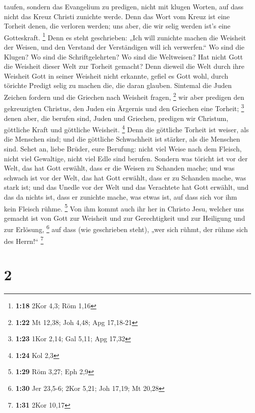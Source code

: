 taufen, sondern das Evangelium zu predigen, nicht mit klugen Worten, auf
dass nicht das Kreuz Christi zunichte werde.  Denn das
Wort vom Kreuz ist eine Torheit denen, die verloren werden; uns aber,
die wir selig werden ist's eine Gotteskraft. \footnote{\textbf{1:18}
  2Kor 4,3; Röm 1,16}  Denn es steht geschrieben: „Ich
will zunichte machen die Weisheit der Weisen, und den Verstand der
Verständigen will ich verwerfen.``  Wo sind die Klugen?
Wo sind die Schriftgelehrten? Wo sind die Weltweisen? Hat nicht Gott die
Weisheit dieser Welt zur Torheit gemacht?  Denn dieweil
die Welt durch ihre Weisheit Gott in seiner Weisheit nicht erkannte,
gefiel es Gott wohl, durch törichte Predigt selig zu machen die, die
daran glauben.  Sintemal die Juden Zeichen fordern und
die Griechen nach Weisheit fragen, \footnote{\textbf{1:22} Mt 12,38; Joh
  4,48; Apg 17,18-21}  wir aber predigen den gekreuzigten
Christus, den Juden ein Ärgernis und den Griechen eine Torheit;
\footnote{\textbf{1:23} 1Kor 2,14; Gal 5,11; Apg 17,32} 
denen aber, die berufen sind, Juden und Griechen, predigen wir Christum,
göttliche Kraft und göttliche Weisheit. \footnote{\textbf{1:24} Kol 2,3}
 Denn die göttliche Torheit ist weiser, als die Menschen
sind; und die göttliche Schwachheit ist stärker, als die Menschen sind.
 Sehet an, liebe Brüder, eure Berufung: nicht viel Weise
nach dem Fleisch, nicht viel Gewaltige, nicht viel Edle sind berufen.
 Sondern was töricht ist vor der Welt, das hat Gott
erwählt, dass er die Weisen zu Schanden mache; und was schwach ist vor
der Welt, das hat Gott erwählt, dass er zu Schanden mache, was stark
ist;  und das Unedle vor der Welt und das Verachtete hat
Gott erwählt, und das da nichts ist, dass er zunichte mache, was etwas
ist,  auf dass sich vor ihm kein Fleisch rühme.
\footnote{\textbf{1:29} Röm 3,27; Eph 2,9}  Von ihm kommt
auch ihr her in Christo Jesu, welcher uns gemacht ist von Gott zur
Weisheit und zur Gerechtigkeit und zur Heiligung und zur Erlösung,
\footnote{\textbf{1:30} Jer 23,5-6; 2Kor 5,21; Joh 17,19; Mt 20,28}
 auf dass (wie geschrieben steht), „wer sich rühmt, der
rühme sich des Herrn!{}`` \footnote{\textbf{1:31} 2Kor 10,17}

\hypertarget{section-1}{%
\section{2}\label{section-1}}

